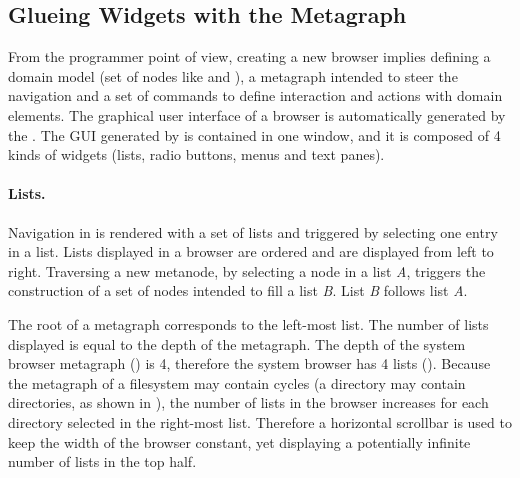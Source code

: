 \documentclass[a4paper,10pt,twoside]{book}
\begin{document}



\subsection{Glueing Widgets with the Metagraph}\label{widgets}
From the programmer point of view, creating a new browser implies defining a domain model (set of nodes like  and ), a metagraph intended to steer the navigation and a set of commands to define interaction and actions with domain elements. The graphical user interface of a browser is automatically generated by the \obf. The GUI generated by \obf is contained in one window, and it is composed of 4 kinds of widgets (lists, radio buttons, menus and text panes).



\paragraph{Lists.} Navigation in \obf is rendered with a set of lists and triggered by selecting one entry in a list. Lists displayed in a browser are ordered and are displayed from left to right. Traversing a new metanode, by selecting a node in a list \textit{A}, triggers the construction of a set of nodes intended to fill a list \textit{B}. List \textit{B} follows list \textit{A}.

The root of a metagraph corresponds to the left-most list. The number of lists displayed is equal to the depth of the metagraph. The depth of the system browser metagraph () is 4, therefore the system browser has 4 lists (). Because the metagraph of a filesystem may contain cycles (\ie a directory may contain directories, as shown in ), the number of lists in the browser increases for each directory selected in the right-most list. Therefore a horizontal scrollbar is used to keep the width of the browser constant, yet displaying a potentially infinite number of lists in the top half.
\end{document}
